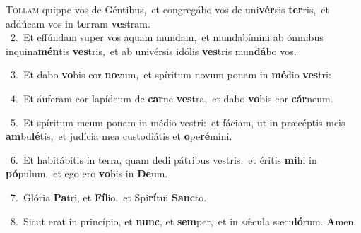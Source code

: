 \lettrine{\initial\textcolor{\initialcolor}{T}}{ollam} quippe vos de Géntibus,~\dagger et congregábo vos de uni\-\textbf{vér}\-sis \textbf{ter}\-ris,~\star et addúcam vos in \textbf{ter}\-ram \textbf{ves}\-tram.\\
{\numbfont\textcolor{\numbcolor}{~2.}}~Et effúndam super vos aquam mundam,~\dagger et mundabímini ab ómnibus inquina\-\textbf{mén}\-tis \textbf{ves}\-tris,~\star et ab univérsis idólis \textbf{ves}\-tris mun\-\textbf{dá}\-bo vos.\par
{\numbfont\textcolor{\numbcolor}{~3.}}~Et dabo \textbf{vo}\-bis cor \textbf{no}\-vum,~\star et spíritum novum ponam in \textbf{mé}\-dio \textbf{ves}\-tri:\par
{\numbfont\textcolor{\numbcolor}{~4.}}~Et áuferam cor lapídeum de \textbf{car}\-ne \textbf{ves}\-tra,~\star et dabo \textbf{vo}\-bis cor \textbf{cár}\-neum.\par
{\numbfont\textcolor{\numbcolor}{~5.}}~Et spíritum meum ponam in médio vestri:~\dagger et fáciam, ut in præcéptis meis \textbf{am}\-bu\-\textbf{lé}\-tis,~\star et judícia mea custodiátis et \textbf{o}\-pe\-\textbf{ré}\-mini.\par
{\numbfont\textcolor{\numbcolor}{~6.}}~Et habitábitis in terra, quam dedi pátribus vestris:~\dagger et éritis \textbf{mi}\-hi in \textbf{pó}\-pulum,~\star et ego ero \textbf{vo}\-bis in \textbf{De}\-um.\par
{\numbfont\textcolor{\numbcolor}{~7.}}~Glória \textbf{Pa}\-tri, et \textbf{Fí}\-lio,~\star et Spi\-\textbf{rí}\-tui \textbf{Sanc}\-to.\par
{\numbfont\textcolor{\numbcolor}{~8.}}~Sicut erat in princípio, et \textbf{nunc}\-, et \textbf{sem}\-per,~\star et in sǽcula sæcu\-\textbf{ló}\-rum. \textbf{A}\-men.\par
